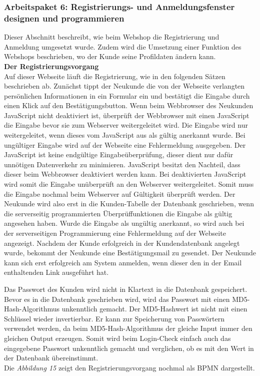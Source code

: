 \newpage
\subsubsection{Arbeitspaket 6: Registrierungs- und Anmeldungsfenster designen und programmieren}
Dieser Abschnitt beschreibt, wie beim Webshop die Registrierung und Anmeldung umgesetzt wurde. Zudem wird die Umsetzung einer Funktion des Webshops beschrieben, wo der Kunde seine Profildaten ändern kann.\\

\textbf{Der Registrierungsvorgang}\\
Auf dieser Webseite läuft die Registrierung, wie in den folgenden Sätzen beschrieben ab. Zunächst tippt der Neukunde die von der Webseite verlangten persönlichen Informationen in ein Formular ein und bestätigt die Eingabe durch einen Klick auf den Bestätigungsbutton. Wenn beim Webbrowser des Neukunden JavaScript nicht deaktiviert ist, überprüft der Webbrowser mit einen JavaScript die Eingabe bevor sie zum Webserver weitergeleitet wird. Die Eingabe wird nur weitergeleitet, wenn dieses vom JavaScript aus als gültig anerkannt wurde. Bei ungültiger Eingabe wird auf der Webseite eine Fehlermeldung ausgegeben. Der JavaScript ist keine endgültige Eingabeüberprüfung, dieser dient nur dafür unnötigen Datenverkehr zu minimieren. JavaScript besitzt den Nachteil, dass dieser beim Webbrowser deaktiviert werden kann. Bei deaktivierten JavaScript wird somit die Eingabe unüberprüft an den Webserver weitergeleitet. Somit muss die Eingabe nochmal beim Webserver auf Gültigkeit überprüft werden.  Der Neukunde wird also erst in die Kunden-Tabelle der Datenbank geschrieben, wenn die serverseitig programmierten Überprüffunktionen die Eingabe als gültig angesehen haben. Wurde die Eingabe als ungültig anerkannt, so wird auch bei der serverseitigen Programmierung eine Fehlermeldung auf der Webseite angezeigt. Nachdem der Kunde erfolgreich in der Kundendatenbank angelegt wurde, bekommt der Neukunde eine Bestätigungsmail zu gesendet. Der Neukunde kann sich erst erfolgreich am System anmelden, wenn dieser den in der Email enthaltenden Link ausgeführt hat. 

Das Passwort des Kunden wird nicht in Klartext in die Datenbank gespeichert. Bevor es in die Datenbank geschrieben wird, wird das Passwort mit einen \glqq MD5-Hash-Algorithmus\grqq{} unkenntlich gemacht. Der MD5-Hashwert ist nicht mit einen Schlüssel wieder invertierbar. Er kann zur Speicherung von Passwörtern verwendet werden, da beim \glqq MD5-Hash-Algorithmus\grqq{} der gleiche Input immer den gleichen Output erzeugen. Somit wird beim Login-Check einfach auch das eingegebene Passwort unkenntlich gemacht und verglichen, ob es mit den Wert in der Datenbank übereinstimmt.\\ Die \textit{Abbildung 15} zeigt den Registrierungsvorgang nochmal als BPMN dargestellt.\\

